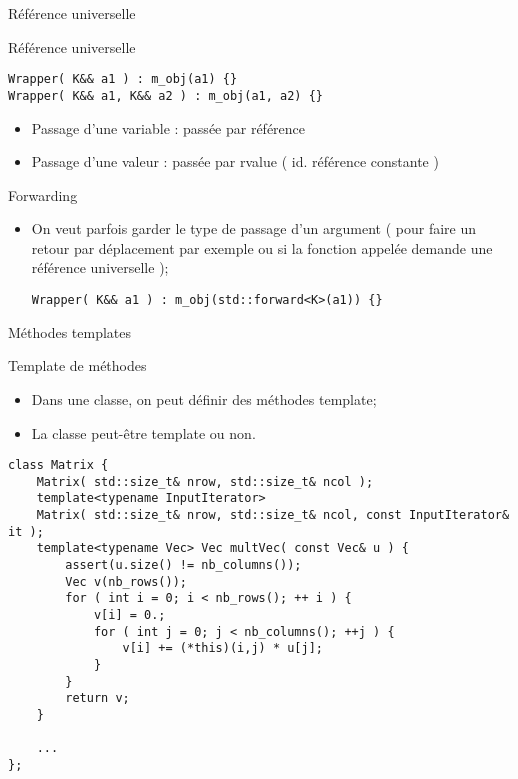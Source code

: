 \documentclass[handout,10pt]{beamer}
\begin{document}
\begin{frame}[fragile]{Référence universelle}
\tiny
\begin{block}{Référence universelle}
\begin{lstlisting}
Wrapper( K&& a1 ) : m_obj(a1) {}
Wrapper( K&& a1, K&& a2 ) : m_obj(a1, a2) {}
\end{lstlisting}
\begin{itemize}
 \item Passage d'une variable : passée par référence
 \item Passage d'une valeur   : passée par rvalue ( id. référence constante )
\end{itemize}
\end{block}
\begin{block}{Forwarding}
\begin{itemize}
\item On veut parfois garder le type de passage d'un argument ( pour faire un retour par déplacement par exemple ou si la fonction appelée demande une référence universelle );
\begin{lstlisting}
Wrapper( K&& a1 ) : m_obj(std::forward<K>(a1)) {}
\end{lstlisting}
\end{itemize}
\end{block}
\end{frame}

\begin{frame}[fragile]{Méthodes templates}
\tiny
\begin{block}{Template de méthodes}
\begin{itemize}
 \item Dans une classe, on peut définir des méthodes template;
 \item La classe peut-être template ou non.
\end{itemize}
\begin{lstlisting}
class Matrix {
    Matrix( std::size_t& nrow, std::size_t& ncol );
    template<typename InputIterator>
    Matrix( std::size_t& nrow, std::size_t& ncol, const InputIterator& it );
    template<typename Vec> Vec multVec( const Vec& u ) {
        assert(u.size() != nb_columns());
        Vec v(nb_rows());
        for ( int i = 0; i < nb_rows(); ++ i ) {
            v[i] = 0.;
            for ( int j = 0; j < nb_columns(); ++j ) {
                v[i] += (*this)(i,j) * u[j];
            }
        }
        return v;
    }
    
    ...
};
\end{lstlisting}
\end{block}

\end{frame}
\end{document}
